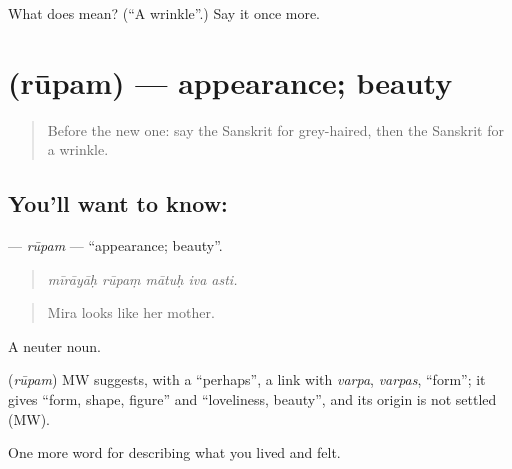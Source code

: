 \begin{tcolorbox}[breakable,colback=teal!4,colframe=teal!35!black,title={Before you move on}]
What does  mean? (\textquotedblleft{}A wrinkle\textquotedblright{}.) Say it once more.
\end{tcolorbox}
\section[\texorpdfstring{\sk{रूपम्} (rūpam)}{रूपम् (rūpam)}]{ (rūpam) — appearance; beauty}

\label{lesson:SA-C490-rupam}



\begin{quote}
Before the new one: say the Sanskrit for grey-haired, then the Sanskrit for a wrinkle.
\end{quote}

\subsection*{You'll want to know: }
\textbf{} — \emph{rūpam} — \textquotedblleft{}appearance; beauty\textquotedblright{}.

\begin{quote}
    
\end{quote}

\begin{quote}
\emph{mīrāyāḥ rūpaṃ mātuḥ iva asti.}
\end{quote}

\begin{quote}
Mira looks like her mother.
\end{quote}

A neuter noun.

\begin{cousinweb}
\textbf{} (\emph{rūpam}) MW suggests, with a \textquotedblleft{}perhaps\textquotedblright{}, a link with \emph{varpa}, \emph{varpas}, \textquotedblleft{}form\textquotedblright{}; it gives \textquotedblleft{}form, shape, figure\textquotedblright{} and \textquotedblleft{}loveliness, beauty\textquotedblright{}, and its origin is not settled (MW).
\end{cousinweb}

\begin{grammarlens}[title={What you've built}]
One more word for describing what you lived and felt.
\end{grammarlens}

